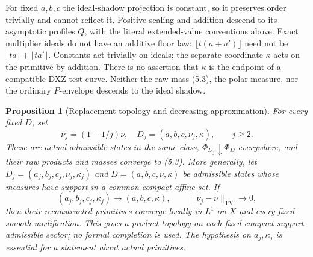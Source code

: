 \documentclass[11pt]{article}
\newtheorem{proposition}[theorem]{Proposition}
\theoremstyle{remark}\newtheorem{remark}[theorem]{Remark}
\newcommand{\TV}{\operatorname{TV}}
\begin{document}
For fixed $a,b,c$ the ideal-shadow projection is constant, so it
preserves order trivially and cannot reflect it. Positive scaling
and addition descend to its asymptotic profiles $Q$, with the
literal extended-value conventions above. Exact multiplier ideals
do not have an additive floor law:
$\lfloor t(a+a')\rfloor$ need not be
$\lfloor ta\rfloor+\lfloor ta'\rfloor$.
Constants act trivially on ideals; the separate coordinate
$\kappa$ acts on the primitive by addition. There is no assertion
that $\kappa$ is the endpoint of a compatible DXZ test curve.
Neither the raw mass (5.3), the polar measure, nor the ordinary
$P$-envelope descends to the ideal shadow.

\begin{proposition}[Replacement topology and decreasing approximation]\label{approx}
For every fixed $D$, set
\[
 \nu_j=(1-1/j)\nu,\quad
 D_j=(a,b,c,\nu_j,\kappa),\qquad j\geq2.
 \tag{5.4}
\]
These are actual admissible states in the same class,
$\Phi_{D_j}\downarrow\Phi_D$ everywhere, and their raw products
and masses converge to (5.3). More generally, let
$D_j=(a_j,b_j,c_j,\nu_j,\kappa_j)$ and
$D=(a,b,c,\nu,\kappa)$ be admissible states whose measures have
support in a common compact affine set. If
\[
 (a_j,b_j,c_j,\kappa_j)\longrightarrow(a,b,c,\kappa),
 \qquad \|\nu_j-\nu\|_{\TV}\longrightarrow0,
\]
then their reconstructed primitives converge locally in $L^1$
on $X$ and every fixed smooth modification. This gives a product
topology on each fixed compact-support admissible sector;
no formal completion is used. The hypothesis on $a_j,\kappa_j$
is essential for a statement about actual primitives.
\end{proposition}
\end{document}
